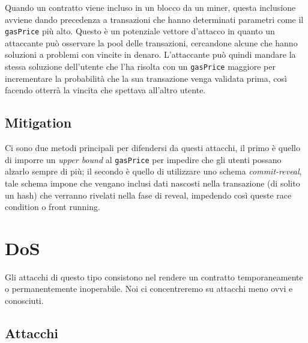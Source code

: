 Quando un contratto viene incluso in un blocco da un miner,
questa inclusione avviene dando precedenza a transazioni che hanno determinati
parametri come il \verb|gasPrice| più alto.
Questo è un potenziale vettore d'attacco in quanto un attaccante può osservare
la pool delle transazioni, cercandone alcune che hanno soluzioni a problemi con
vincite in denaro. L'attaccante può quindi mandare la stessa soluzione dell'utente
che l'ha risolta con un \verb|gasPrice| maggiore per incrementare la probabilità
che la sua transazione venga validata prima, così facendo otterrà la vincita
che spettava all'altro utente.

\subsection{Mitigation}

Ci sono due metodi principali per difendersi da questi attacchi,
il primo è quello di imporre un \textit{upper bound} al \verb|gasPrice|
per impedire che gli utenti possano alzarlo sempre di più;
il secondo è quello di utilizzare uno schema \textit{commit-reveal},
tale schema impone che vengano inclusi dati nascosti nella transazione
(di solito un hash) che verranno rivelati nella fase di reveal,
impedendo così queste race condition o front running.

\section{DoS}

Gli attacchi di questo tipo consistono nel rendere un contratto temporaneamente
o permanentemente inoperabile.
Noi ci concentreremo su attacchi meno ovvi e conosciuti.

\subsection{Attacchi}

